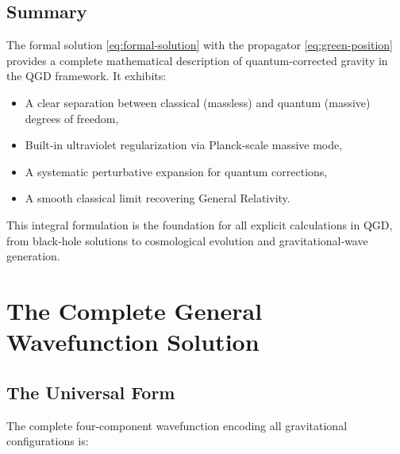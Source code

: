 \documentclass[11pt,a4paper]{article}
\theoremstyle{definition}
\theoremstyle{remark}
\begin{document}
	\subsection{Summary}
	
	The formal solution \eqref{eq:formal-solution} with the propagator \eqref{eq:green-position} provides a complete mathematical description of quantum‑corrected gravity in the QGD framework. It exhibits:
	\begin{itemize}
		\item A clear separation between classical (massless) and quantum (massive) degrees of freedom,
		\item Built‑in ultraviolet regularization via Planck‑scale massive mode,
		\item A systematic perturbative expansion for quantum corrections,
		\item A smooth classical limit recovering General Relativity.
	\end{itemize}
	
	This integral formulation is the foundation for all explicit calculations in QGD, from black‑hole solutions to cosmological evolution and gravitational‑wave generation.
	
	\section{The Complete General Wavefunction Solution}
	\label{sec:general_wavefunction}
	
	\subsection{The Universal Form}
	
	The complete four-component wavefunction encoding all gravitational configurations is:
	
\end{document}
